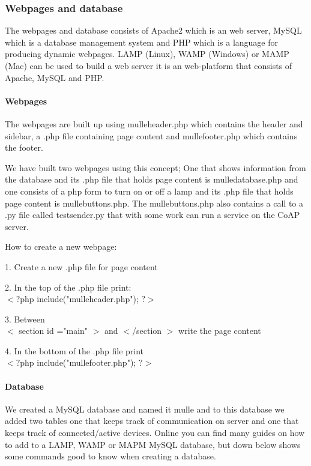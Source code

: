 \subsubsection{Webpages and database}
 
The webpages and database consists of Apache2 which is an web server, MySQL which is a database management system and PHP which is a language for producing dynamic webpages.
LAMP (Linux), WAMP (Windows) or MAMP (Mac) can be used to build a web server it is an web-platform that consists of Apache, MySQL and PHP.

\paragraph{Webpages}

The webpages are built up using mulleheader.php which contains the header and sidebar, a .php file containing page content and mullefooter.php which contains the footer.

We have built two webpages using this concept; One that shows information from the database and its .php file that holds page content is mulledatabase.php and one consists of 
a php form to turn on or off a lamp and its .php file that holds page content is mullebuttons.php. The mullebuttons.php also contains a call to a .py file called testsender.py
that with some work can run a service on the CoAP server.


How to create a new webpage:

1. 	Create a new .php file for page content

2. 	In the top of the .php file print:\\$<?$php include("mulleheader.php"); $?>$

3. 	Between \\$<$ section id ="main" $>$ and $<$/section $>$ write the page content

4. 	In the bottom of the .php file print\\$<?$php include("mullefooter.php"); $?>$

\paragraph{Database}

We created a MySQL database and named it mulle and to this database we added two tables one that keeps track of communication on server and one that keeps track of connected/active 
devices. Online you can find many guides on how to add to a LAMP, WAMP or MAPM MySQL database, but down below shows some commands good to know when creating a database.  


